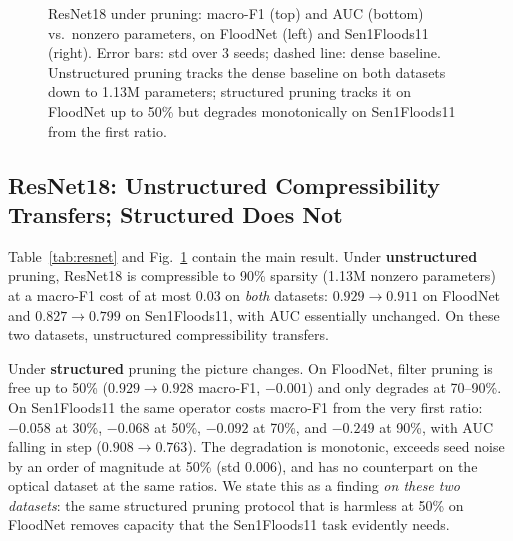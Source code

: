 \documentclass[conference]{IEEEtran}
\begin{document}
\begin{figure}[t]
\caption{ResNet18 under pruning: macro-F1 (top) and AUC (bottom)
vs.\ nonzero parameters, on FloodNet (left) and Sen1Floods11 (right).
Error bars: std over 3 seeds; dashed line: dense baseline. Unstructured
pruning tracks the dense baseline on both datasets down to 1.13M
parameters; structured pruning tracks it on FloodNet up to 50\% but
degrades monotonically on Sen1Floods11 from the first ratio.}
\label{fig:curves}
\end{figure}

\subsection{ResNet18: Unstructured Compressibility Transfers;
Structured Does Not}
Table~\ref{tab:resnet} and Fig.~\ref{fig:curves} contain the main
result. Under \textbf{unstructured} pruning, ResNet18 is compressible
to 90\% sparsity (1.13M nonzero parameters) at a macro-F1 cost of at
most $0.03$ on \emph{both} datasets: $0.929 \to 0.911$ on FloodNet and
$0.827 \to 0.799$ on Sen1Floods11, with AUC essentially unchanged. On
these two datasets, unstructured compressibility transfers.

Under \textbf{structured} pruning the picture changes. On FloodNet,
filter pruning is free up to 50\% ($0.929 \to 0.928$ macro-F1,
$-0.001$) and only degrades at 70--90\%. On Sen1Floods11 the same
operator costs macro-F1 from the very first ratio: $-0.058$ at 30\%,
$-0.068$ at 50\%, $-0.092$ at 70\%, and $-0.249$ at 90\%, with AUC
falling in step ($0.908 \to 0.763$). The degradation is monotonic,
exceeds seed noise by an order of magnitude at 50\% (std $0.006$), and
has no counterpart on the optical dataset at the same ratios. We state
this as a finding \emph{on these two datasets}: the same structured
pruning protocol that is harmless at 50\% on FloodNet removes capacity
that the Sen1Floods11 task evidently needs.
\end{document}
